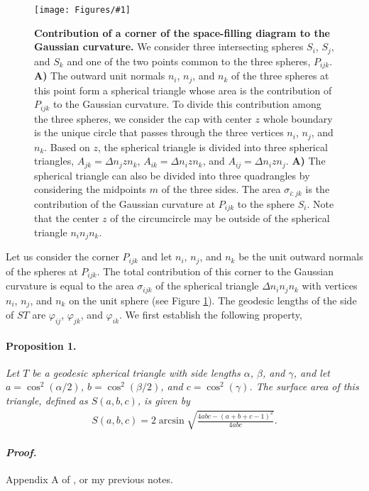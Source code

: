 \documentclass[11 pt]{article}
\theoremstyle{plain} \theorembodyfont{\rmfamily}
\newcommand{\centerfig}[2]{%
\centerline{\texttt{[image: Figures/\#1]}}
}
\begin{document}
  \begin{figure}[hbt]
\centerfig{Spherical_new}{height=2.5in}
\caption{ \textbf{Contribution of a corner of the space-filling diagram to the Gaussian curvature.} We consider three intersecting spheres $S_i$, $S_j$, and $S_k$ and one of the two points common to the three spheres, $P_{ijk}$. \textbf{A)} The outward unit normals $n_i$, $n_j$, and $n_k$ of the three spheres at this point form a spherical triangle whose area is the contribution of $P_{ijk}$ to the Gaussian curvature. To divide this contribution among the three spheres, we consider the cap with center $z$ whole boundary is the unique circle that passes through the three vertices $n_i$, $n_j$, and $n_k$. Based on $z$, the spherical triangle is divided into three spherical triangles, $A_{jk} = \Delta n_j z n_k$, $A_{ik}=\Delta n_i z n_k$, and $A_{ij}=\Delta n_i z n_j$. \textbf{A)} The spherical triangle can also be divided into three quadrangles by considering the midpoints $m$ of the three sides. The area $\sigma_{i:jk}$ is the contribution of the Gaussian curvature at $P_{ijk}$ to the sphere $S_i$. Note that the center $z$ of the circumcircle may be outside of the spherical triangle $n_i n_j n_k$.}
\label{fig:Spherical}
\end{figure}

  Let us consider the corner $P_{ijk}$ and let $n_i$, $n_j$, and $n_k$ be the unit outward normals of the spheres at $P_{ijk}$. The total contribution of this corner to the Gaussian curvature is equal to the area $\sigma_{ijk}$ of the spherical triangle $\Delta n_i n_j n_k$ with vertices $n_i$, $n_j$, and $n_k$ on the unit sphere (see Figure \ref{fig:Spherical}).   The geodesic lengths of the side of $ST$ are $\varphi_{ij}$, $\varphi_{jk}$, and $\varphi_{ik}$.  We first establish the following property,
\paragraph{Proposition 1.} \emph{Let $T$ be a geodesic spherical triangle with side lengths $\alpha$, $\beta$, and $\gamma$, and let $a=\cos^2(\alpha/2)$, $b=\cos^2(\beta/2)$, and $c=\cos^2(\gamma)$. The surface area of this triangle, defined as $S(a,b,c)$, is given by}
  \begin{eqnarray}
  S(a,b,c) = 2 \arcsin{\sqrt{ \frac{4abc - (a+b+c-1)^2}{4abc} } }.
  \end{eqnarray}
  \paragraph{\emph{Proof.}} Appendix A of \cite{AkEd19b}, or my previous notes.
  
\end{document}
